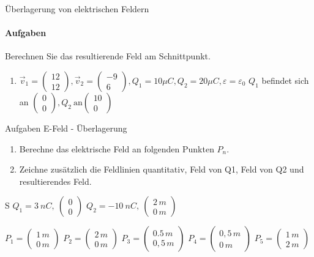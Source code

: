 \begin{frame}{Überlagerung von elektrischen Feldern}
\framesubtitle{Aufgaben}
\label{AufgabeUeberlagerungE-Felder}
Berechnen Sie das resultierende Feld am Schnittpunkt.
  \begin{enumerate}
   \item $\vec{v}_1 = \left(\begin{array}{c}12\\ 12 \end{array} \right), \vec{v}_2 = \left(\begin{array}{c}-9\\ 6 \end{array} \right), Q_1 = 10\mu C, Q_2 = 20\mu C, \varepsilon =\varepsilon_0$ $Q_1$ befindet sich an $\left(\begin{array}{c}0\\ 0 \end{array} \right), Q_2\ \text{an} \left(\begin{array}{c}10\\ 0 \end{array} \right)$
\end{enumerate}
\end{frame}

\begin{frame}{Aufgaben E-Feld - Überlagerung}

\begin{enumerate}
 \item Berechne das elektrische Feld an folgenden Punkten $P_n$.
 \item Zeichne zusätzlich die Feldlinien quantitativ, Feld von Q1, Feld von Q2 und resultierendes Feld.
\end{enumerate}
S
$Q_1 = 3\ nC,\ \left( \begin{array}{c}0 \\ 0\end{array} \right)$ $Q_2 =-10\ nC, \ \left( \begin{array}{c}2\,m\\0\,m \end{array} \right)$

$P_1 =\left( \begin{array}{c}1\,m \\ 0\, m\end{array} \right)$
$P_2 =\left( \begin{array}{c}2\,m \\ 0\, m\end{array} \right)$
$P_3 =\left( \begin{array}{c}0.5\,m \\ 0,5\, m\end{array} \right)$
$P_4 =\left( \begin{array}{c}0,5\,m \\ 0\, m\end{array} \right)$
$P_5 =\left( \begin{array}{c}1\,m \\ 2\, m\end{array} \right)$
\end{frame}

